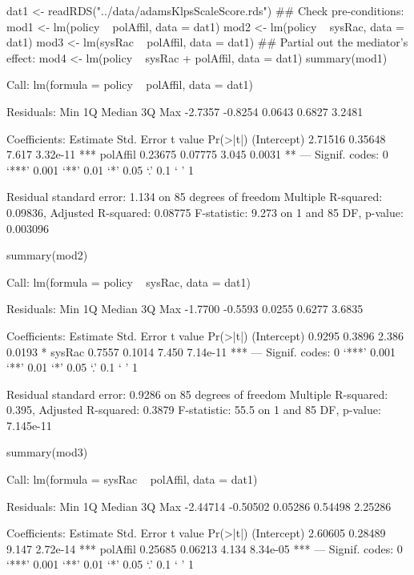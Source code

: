 \begin{Schunk}
\begin{Sinput}
 dat1 <- readRDS("../data/adamsKlpsScaleScore.rds")
 ## Check pre-conditions:
 mod1 <- lm(policy ~ polAffil, data = dat1)
 mod2 <- lm(policy ~ sysRac, data = dat1)
 mod3 <- lm(sysRac ~ polAffil, data = dat1)
 ## Partial out the mediator's effect:
 mod4 <- lm(policy ~ sysRac + polAffil, data = dat1)
 summary(mod1)
\end{Sinput}
\begin{Soutput}
Call:
lm(formula = policy ~ polAffil, data = dat1)

Residuals:
    Min      1Q  Median      3Q     Max 
-2.7357 -0.8254  0.0643  0.6827  3.2481 

Coefficients:
            Estimate Std. Error t value Pr(>|t|)    
(Intercept)  2.71516    0.35648   7.617 3.32e-11 ***
polAffil     0.23675    0.07775   3.045   0.0031 ** 
---
Signif. codes:  0 ‘***’ 0.001 ‘**’ 0.01 ‘*’ 0.05 ‘.’ 0.1 ‘ ’ 1

Residual standard error: 1.134 on 85 degrees of freedom
Multiple R-squared:  0.09836,	Adjusted R-squared:  0.08775 
F-statistic: 9.273 on 1 and 85 DF,  p-value: 0.003096
\end{Soutput}
\begin{Sinput}
 summary(mod2)
\end{Sinput}
\begin{Soutput}
Call:
lm(formula = policy ~ sysRac, data = dat1)

Residuals:
    Min      1Q  Median      3Q     Max 
-1.7700 -0.5593  0.0255  0.6277  3.6835 

Coefficients:
            Estimate Std. Error t value Pr(>|t|)    
(Intercept)   0.9295     0.3896   2.386   0.0193 *  
sysRac        0.7557     0.1014   7.450 7.14e-11 ***
---
Signif. codes:  0 ‘***’ 0.001 ‘**’ 0.01 ‘*’ 0.05 ‘.’ 0.1 ‘ ’ 1

Residual standard error: 0.9286 on 85 degrees of freedom
Multiple R-squared:  0.395,	Adjusted R-squared:  0.3879 
F-statistic:  55.5 on 1 and 85 DF,  p-value: 7.145e-11
\end{Soutput}
\begin{Sinput}
 summary(mod3)
\end{Sinput}
\begin{Soutput}
Call:
lm(formula = sysRac ~ polAffil, data = dat1)

Residuals:
     Min       1Q   Median       3Q      Max 
-2.44714 -0.50502  0.05286  0.54498  2.25286 

Coefficients:
            Estimate Std. Error t value Pr(>|t|)    
(Intercept)  2.60605    0.28489   9.147 2.72e-14 ***
polAffil     0.25685    0.06213   4.134 8.34e-05 ***
---
Signif. codes:  0 ‘***’ 0.001 ‘**’ 0.01 ‘*’ 0.05 ‘.’ 0.1 ‘ ’ 1


\end{Soutput}
\end{Schunk}
